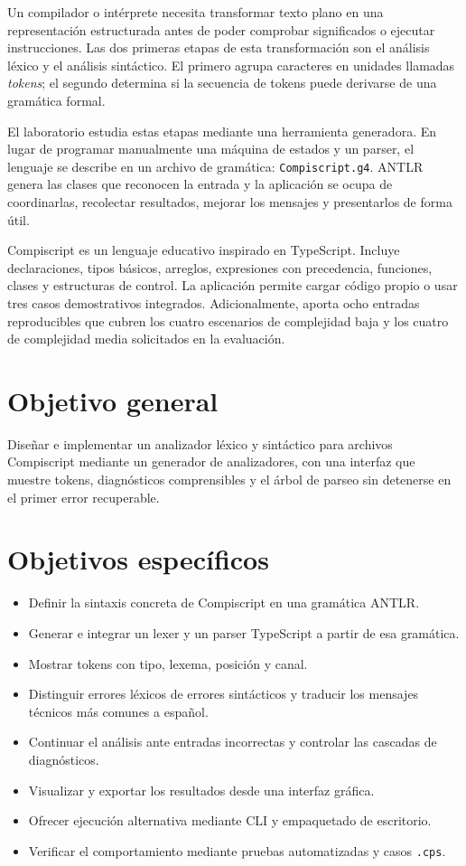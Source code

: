 \documentclass[12pt,letterpaper,oneside]{report}
\newcommand{\archivo}[1]{\texttt{#1}}
\newcommand{\cps}{\texttt{.cps}}
\begin{document}
Un compilador o intérprete necesita transformar texto plano en una representación
estructurada antes de poder comprobar significados o ejecutar instrucciones. Las dos
primeras etapas de esta transformación son el análisis léxico y el análisis
sintáctico. El primero agrupa caracteres en unidades llamadas \emph{tokens}; el
segundo determina si la secuencia de tokens puede derivarse de una gramática formal.

El laboratorio estudia estas etapas mediante una herramienta generadora. En lugar de
programar manualmente una máquina de estados y un parser, el lenguaje se describe en
un archivo de gramática: \archivo{Compiscript.g4}. ANTLR genera las clases que
reconocen la entrada y la aplicación se ocupa de coordinarlas, recolectar resultados,
mejorar los mensajes y presentarlos de forma útil.

Compiscript es un lenguaje educativo inspirado en TypeScript. Incluye declaraciones,
tipos básicos, arreglos, expresiones con precedencia, funciones, clases y estructuras
de control. La aplicación permite cargar código propio o usar tres casos demostrativos
integrados. Adicionalmente,  aporta ocho entradas reproducibles
que cubren los cuatro escenarios de complejidad baja y los cuatro de complejidad
media solicitados en la evaluación.

\section{Objetivo general}

Diseñar e implementar un analizador léxico y sintáctico para archivos Compiscript
mediante un generador de analizadores, con una interfaz que muestre tokens,
diagnósticos comprensibles y el árbol de parseo sin detenerse en el primer error
recuperable.

\vspace{8cm}

\section{Objetivos específicos}

\begin{itemize}
  \item Definir la sintaxis concreta de Compiscript en una gramática ANTLR.
  \item Generar e integrar un lexer y un parser TypeScript a partir de esa gramática.
  \item Mostrar tokens con tipo, lexema, posición y canal.
  \item Distinguir errores léxicos de errores sintácticos y traducir los mensajes
        técnicos más comunes a español.
  \item Continuar el análisis ante entradas incorrectas y controlar las cascadas de
        diagnósticos.
  \item Visualizar y exportar los resultados desde una interfaz gráfica.
  \item Ofrecer ejecución alternativa mediante CLI y empaquetado de escritorio.
  \item Verificar el comportamiento mediante pruebas automatizadas y casos \cps.
\end{itemize}
\end{document}
